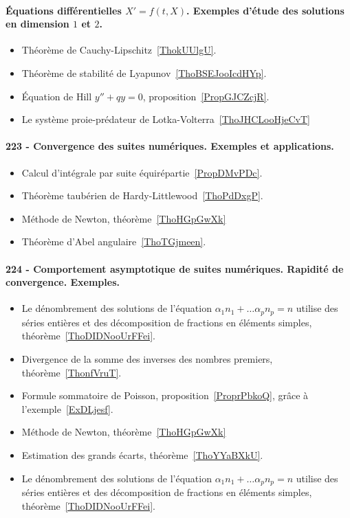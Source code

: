 \paragraph{Équations différentielles $X' = f (t , X )$. Exemples d'étude des solutions en dimension $1$ et $2$.}
\begin{itemize}
    \item Théorème de Cauchy-Lipschitz~\ref{ThokUUlgU}.
    \item Théorème de stabilité de Lyapunov~\ref{ThoBSEJooIcdHYp}.
    \item Équation de Hill \( y''+qy=0\), proposition~\ref{PropGJCZcjR}.
    \item Le système proie-prédateur de Lotka-Volterra~\ref{ThoJHCLooHjeCvT}
\end{itemize}
\paragraph{223 - Convergence des suites numériques. Exemples et applications.}
\begin{itemize}
    \item Calcul d'intégrale par suite équirépartie~\ref{PropDMvPDc}.
    \item Théorème taubérien de Hardy-Littlewood~\ref{ThoPdDxgP}.
    \item Méthode de Newton, théorème~\ref{ThoHGpGwXk}
    \item Théorème d'Abel angulaire~\ref{ThoTGjmeen}.
\end{itemize}
\paragraph{224 - Comportement asymptotique de suites numériques. Rapidité de convergence. Exemples.}
\begin{itemize}
    \item Le dénombrement des solutions de l'équation \( \alpha_1 n_1+\ldots \alpha_pn_p=n\) utilise des séries entières et des décomposition de fractions en éléments simples, théorème~\ref{ThoDIDNooUrFFei}.
    \item Divergence de la somme des inverses des nombres premiers, théorème~\ref{ThonfVruT}.
    \item Formule sommatoire de Poisson, proposition~\ref{ProprPbkoQ}, grâce à l'exemple~\ref{ExDLjesf}.
    \item Méthode de Newton, théorème~\ref{ThoHGpGwXk}
    \item Estimation des grands écarts, théorème~\ref{ThoYYaBXkU}.
    \item Le dénombrement des solutions de l'équation \( \alpha_1 n_1+\ldots \alpha_pn_p=n\) utilise des séries entières et des décomposition de fractions en éléments simples, théorème~\ref{ThoDIDNooUrFFei}.
\end{itemize}
